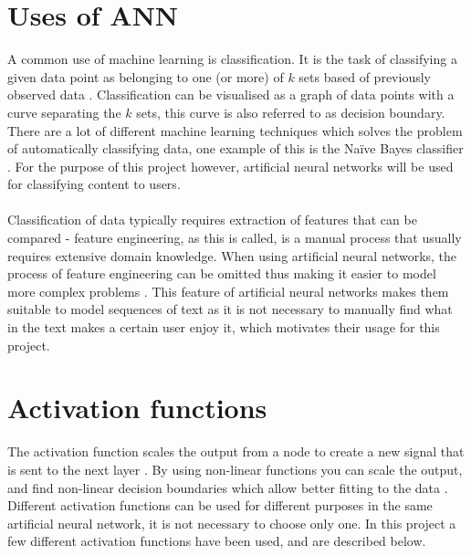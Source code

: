 \section{Uses of ANN}
A common use of machine learning is classification. It is the task of classifying a given data point as belonging to one (or more) of $k$ sets based of previously observed data \parencite{Michie94machinelearning}. Classification can be visualised as a graph of data points with a curve separating the $k$ sets, this curve is also referred to as decision boundary. There are a lot of different machine learning techniques which solves the problem of automatically classifying data, one example of this is the Naïve Bayes classifier \parencite{rish2001empirical}. For the purpose of this project however, artificial neural networks will be used for classifying content to users.
\\\\
Classification of data typically requires extraction of features that can be compared - feature engineering, as this is called, is a manual process that usually requires extensive domain knowledge. When using artificial neural networks, the process of feature engineering can be omitted  thus making it easier to model more complex problems \parencite{nlp2011ronan}. This feature of artificial neural networks makes them suitable to model sequences of text as it is not necessary to manually find what in the text makes a certain user enjoy it, which motivates their usage for this project.


\section{Activation functions}\label{activationfunction}
The activation function scales the output from a node to create a new signal that is sent to the next layer \parencite{basheer2000artificial}. By using non-linear functions you can scale the output, and find non-linear decision boundaries which allow better fitting to the data \parencite{lippmann1987introduction, basheer2000artificial}. Different activation functions can be used for different purposes in the same artificial neural network, it is not necessary to choose only one. In this project a few different activation functions have been used, and are described below.


